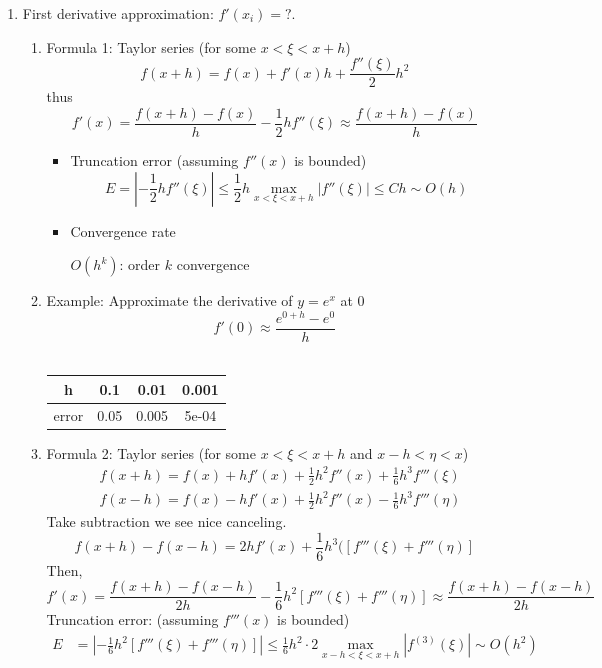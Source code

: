 \documentclass{article}
\theoremstyle{remark}
\begin{document}
\begin{enumerate}
\item First derivative approximation: $f'(x_i) = ?$.
\begin{enumerate}
\item Formula 1: Taylor series (for some $x<\xi<x+h$)
$$
f(x+h) = f(x) + f'(x)h + \frac{f''(\xi)}{2}h^2 
$$
thus
$$
f'(x) = \frac{f(x+h)-f(x)}{h} - \frac{1}{2}hf''(\xi) \approx \frac{f(x+h)-f(x)}{h} 
$$
\begin{itemize}
\item Truncation error (assuming $f''(x)$ is bounded)
\begin{equation*}
E = |-\frac{1}{2}hf''(\xi)| \leq \frac{1}{2}h\max_{x<\xi<x+h}|f''(\xi)| \leq Ch\sim O(h)
\end{equation*}
\item Convergence rate
\begin{center}
$O(h^k)$: order $k$ convergence
\end{center}
\end{itemize}

\item Example: Approximate the derivative of $y = e^x$ at $0$
$$
f'(0) \approx \frac{e^{0+h}-e^0}{h}
$$\\
\begin{center}
\begin{tabular}{|c|c|c|c|}
\hline
h & 0.1 & 0.01& 0.001\\\hline
error & 0.05 & 0.005 & 5e-04\\\hline
\end{tabular}
\end{center}

\item Formula 2: Taylor series (for some $x<\xi<x+h$ and $x-h<\eta<x$)
\begin{equation*}
\begin{split}
& f(x+h) = f(x) + hf'(x) + \frac{1}{2}h^2f''(x)+ \frac{1}{6}h^3f'''(\xi)\\
& f(x-h) = f(x) - hf'(x) + \frac{1}{2}h^2f''(x)- \frac{1}{6}h^3f'''(\eta)
\end{split}
\end{equation*}
Take subtraction we see nice canceling.
$$
f(x+h)-f(x-h) = 2hf'(x) + \frac{1}{6}h^3([f'''(\xi)+f'''(\eta)]
$$
Then,
$$
f'(x) = \frac{f(x+h)-f(x-h)}{2h}-\frac{1}{6}h^2[f'''(\xi)+f'''(\eta)] \approx \frac{f(x+h)-f(x-h)}{2h}
$$
Truncation error: (assuming $f'''(x)$ is bounded)
\begin{equation*}
\begin{split}
E & = \left|-\frac{1}{6}h^2[f'''(\xi)+f'''(\eta)]\right| \leq \frac{1}{6}h^2\cdot 2\max_{x-h<\xi<x+h}|f^{(3)}(\xi)|\sim O(h^2)\\
\end{split}
\end{equation*}



\end{enumerate}
\end{enumerate}
\end{document}
